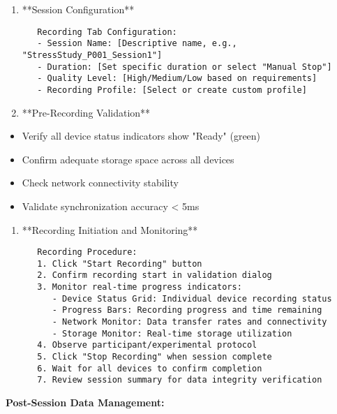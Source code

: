 \documentclass[11pt,a4paper]{article}
\begin{document}
\begin{enumerate}
\item **Session Configuration**
\begin{verbatim}
   Recording Tab Configuration:
   - Session Name: [Descriptive name, e.g., "StressStudy_P001_Session1"]
   - Duration: [Set specific duration or select "Manual Stop"]
   - Quality Level: [High/Medium/Low based on requirements]
   - Recording Profile: [Select or create custom profile]
\end{verbatim}

\item **Pre-Recording Validation**
\end{enumerate}
\begin{itemize}
\item Verify all device status indicators show "Ready" (green)
\item Confirm adequate storage space across all devices
\item Check network connectivity stability
\item Validate synchronization accuracy < 5ms

\end{itemize}
\begin{enumerate}
\item **Recording Initiation and Monitoring**
\begin{verbatim}
   Recording Procedure:
   1. Click "Start Recording" button
   2. Confirm recording start in validation dialog
   3. Monitor real-time progress indicators:
      - Device Status Grid: Individual device recording status
      - Progress Bars: Recording progress and time remaining
      - Network Monitor: Data transfer rates and connectivity
      - Storage Monitor: Real-time storage utilization
   4. Observe participant/experimental protocol
   5. Click "Stop Recording" when session complete
   6. Wait for all devices to confirm completion
   7. Review session summary for data integrity verification
\end{verbatim}

\end{enumerate}
\textbf{Post-Session Data Management:}
\end{document}
